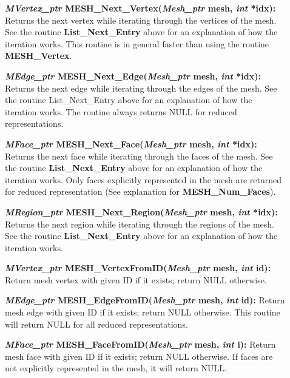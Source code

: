 \documentclass[12pt]{article}
\begin{document}
\begin{description}
\item[]

\item[]{\bf {\em MVertex\_ptr} MESH\_Next\_Vertex({\em Mesh\_ptr}
    mesh, {\em int} *idx):} Returns the next vertex while iterating
  through the vertices of the mesh. See the routine {\bf
    List\_Next\_Entry} above for an explanation of how the iteration
  works. This routine is in general faster than using the routine {\bf
    MESH\_Vertex}.

\item[]{\bf {\em MEdge\_ptr} MESH\_Next\_Edge({\em Mesh\_ptr} mesh,
{\em int} *idx):} Returns the next edge while iterating through the
edges of the mesh. See the routine List\_Next\_Entry above for an
explanation of how the iteration works.  The routine always returns
NULL for reduced representations.

\item[]{\bf {\em MFace\_ptr} MESH\_Next\_Face({\em Mesh\_ptr} mesh,
{\em int} *idx):} Returns the next face while iterating through the
faces of the mesh. See the routine {\bf List\_Next\_Entry} above for
an explanation of how the iteration works.  Only faces explicitly
represented in the mesh are returned for reduced representation (See
explanation for {\bf MESH\_Num\_Faces}).

\item[]{\bf {\em MRegion\_ptr}
    MESH\_Next\_Region({\em Mesh\_ptr} mesh, {\em int} *idx):}
  Returns the next region while iterating through the regions of the
  mesh. See the routine {\bf List\_Next\_Entry} above for an
  explanation of how the iteration works.
  
\item[]

\item[]{\bf {\em MVertex\_ptr}
    MESH\_VertexFromID({\em Mesh\_ptr} mesh, {\em int} id):}
  Return mesh vertex with given ID if it exists; return NULL
  otherwise.
  
\item[]{\bf {\em MEdge\_ptr} MESH\_EdgeFromID({\em Mesh\_ptr}
    mesh, {\em int} id):} Return mesh edge with given ID if it
  exists; return NULL otherwise. This routine will return NULL for all
  reduced representations.

\item[]{\bf {\em MFace\_ptr} MESH\_FaceFromID({\em Mesh\_ptr}
    mesh, {\em int} i):} Return mesh face with given ID if it
  exists; return NULL otherwise. If faces are not explicitly
  represented in the mesh, it will return NULL.



\end{description}
\end{document}
